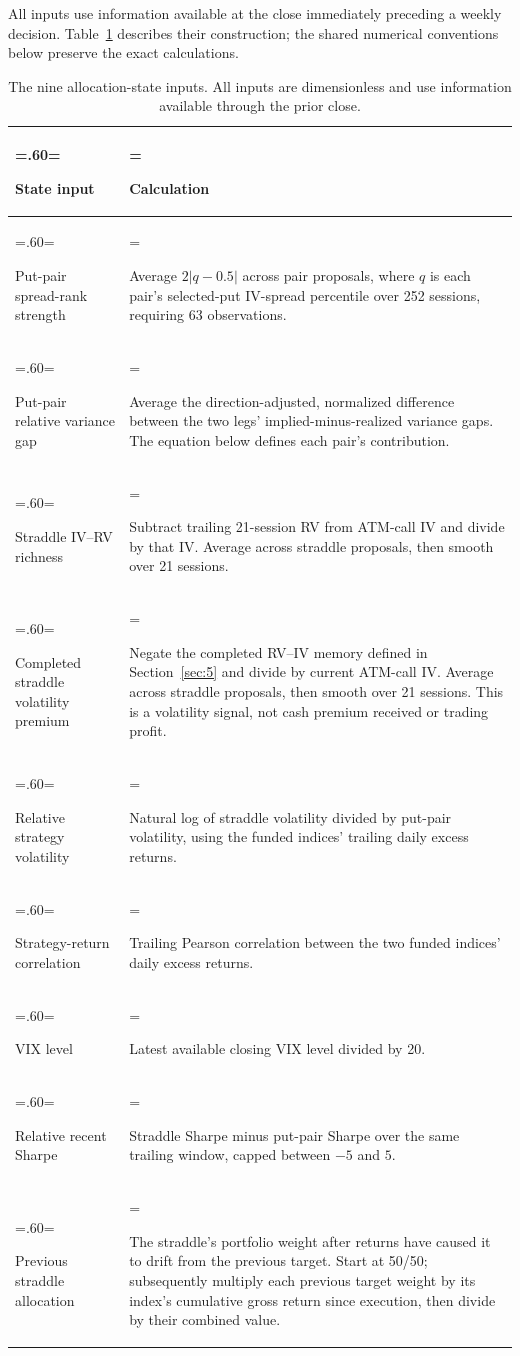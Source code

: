 All inputs use information available at the close immediately preceding a weekly decision. Table~\ref{tab:allocation-state} describes their construction; the shared numerical conventions below preserve the exact calculations.

\begin{table}[H]\centering\small
\caption{The nine allocation-state inputs. All inputs are dimensionless and use information available through the prior close.}\label{tab:allocation-state}
\setlength{\tabcolsep}{5pt}\renewcommand{\arraystretch}{1.18}
\begin{tabularx}{\textwidth}{@{}>{\hsize=.60\hsize\linewidth=\hsize\raggedright\arraybackslash}X>{\hsize=1.40\hsize\linewidth=\hsize\raggedright\arraybackslash}X@{}}\toprule
\textbf{State input} & \textbf{Calculation}\\\midrule
Put-pair spread-rank strength & Average \(2|q-0.5|\) across pair proposals, where \(q\) is each pair's selected-put IV-spread percentile over 252 sessions, requiring 63 observations.\\[5pt]
Put-pair relative variance gap & Average the direction-adjusted, normalized difference between the two legs' implied-minus-realized variance gaps. The equation below defines each pair's contribution.\\[5pt]
Straddle IV--RV richness & Subtract trailing 21-session RV from ATM-call IV and divide by that IV. Average across straddle proposals, then smooth over 21 sessions.\\[5pt]
Completed straddle volatility premium & Negate the completed RV--IV memory defined in Section~\ref{sec:5} and divide by current ATM-call IV. Average across straddle proposals, then smooth over 21 sessions. This is a volatility signal, not cash premium received or trading profit.\\[5pt]
Relative strategy volatility & Natural log of straddle volatility divided by put-pair volatility, using the funded indices' trailing daily excess returns.\\[5pt]
Strategy-return correlation & Trailing Pearson correlation between the two funded indices' daily excess returns.\\[5pt]
VIX level & Latest available closing VIX level divided by 20.\\[5pt]
Relative recent Sharpe & Straddle Sharpe minus put-pair Sharpe over the same trailing window, capped between \(-5\) and \(5\).\\[5pt]
Previous straddle allocation & The straddle's portfolio weight after returns have caused it to drift from the previous target. Start at 50/50; subsequently multiply each previous target weight by its index's cumulative gross return since execution, then divide by their combined value.\\
\bottomrule\end{tabularx}
\end{table}

